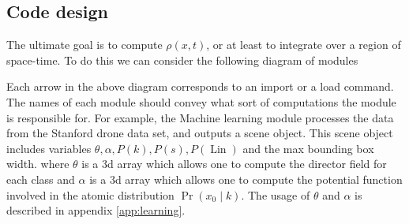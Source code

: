 \documentclass[12pt]{amsart}
\DeclareMathOperator{\Lin}{Lin}
\begin{document}
\subsection{Code design}

The ultimate goal is to compute $\rho(x,t)$, or at least to integrate over a region of space-time.
To do this we can consider the following diagram of modules


Each arrow in the above diagram corresponds to an import or a load command.
The names of each module should convey what sort of computations the module is responsible for.
For example, the Machine learning module processes the data from the Stanford drone data set, and outputs a scene object.
This scene object includes variables $\theta, \alpha, P(k), P(s), P(\Lin)$ and the max bounding box width.
where $\theta$ is a 3d array which allows one to compute the director field for each class
and $\alpha$ is a 3d array which allows one to compute the potential function involved in the atomic distribution $\Pr( x_0 \mid k)$.
The usage of $\theta$ and $\alpha$ is described in appendix \ref{app:learning}.
\end{document}
